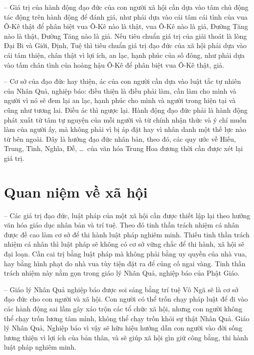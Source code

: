 -- Giá trị của hành động đạo đức của con người xã hội cần dựa vào tâm chủ động tác động trên hành động để đánh giá, như phải dựa vào cái tâm cái tình của vua Ô-Kê thật để phân biệt vua Ô-Kê nào là thật, vua Ô-Kê nào là giả, Đường Tăng nào là thật, Đường Tăng nào là giả. Nếu tiêu chuẩn giá trị của giải thoát là lòng Đại Bi và Giới, Định, Tuệ thì tiêu chuẩn giá trị đạo đức của xã hội phải dựa vào cái tâm thiện, chân thật vì lợi ích, an lạc, hạnh phúc của số đông, như phải dựa vào tấm chân tình của hoàng hậu Ô-Kê để phân biệt vua Ô-Kê thật, giả.

-- Cơ sở của đạo đức hay thiện, ác của con người cần dựa vào luật tắc tự nhiên của Nhân Quả, nghiệp báo: điều thiện là điều phải làm, cần làm cho mình và người vì nó sẽ đem lại an lạc, hạnh phúc cho mình và người trong hiện tại và cũng như tương lai. Điều ác thì ngược lại. Hành động đạo đức phải là hành động phát xuất từ tâm tự nguyện của mỗi người và từ chính nhận thức và ý chí muốn làm của người ấy, mà không phải vì bị áp đặt hay vì nhân danh một thế lực nào từ bên ngoài. Đây là hướng đạo đức nhân bản, theo đó, các quy ước về Hiếu, Trung, Tình, Nghĩa, Đễ, \ldots ~của văn hóa Trung Hoa đương thời cần được xét lại giá trị.

\section{Quan niệm về xã hội} %
\label{sec:36_37_xa_hoi}

-- Các giá trị đạo đức, luật pháp của một xã hội cần được thiết lập lại theo hướng văn hóa giáo dục nhân bản và trí tuệ. Theo đó tinh thần trách nhiệm cá nhân được đề cao làm cơ sở để thi hành luật pháp nghiêm minh. Thiếu tinh thần trách nhiệm cá nhân thì luật pháp sẽ không có cơ sở vững chắc để thi hành, xã hội sẽ đại loạn. Cần cai trị bằng luật pháp mà không phải bằng uy quyền của nhà vua, hay bằng hình phạt do nhà vua tùy tiện đặt ra để củng cố ngai vàng. Tinh thần trách nhiệm này nằm gọn trong giáo lý Nhân Quả, nghiệp báo của Phật Giáo.

-- Giáo lý Nhân Quả nghiệp báo được soi sáng bằng trí tuệ Vô Ngã sẽ là cơ sở đạo đức cho con người và xã hội. Con người có thể trốn chạy pháp luật để đi vào các hành động sai lầm gây xáo trộn các tổ chức xã hội, nhưng con người không thể chạy trốn lương tâm mình, không thể chạy trốn khỏi sự thật Nhân Quả. Giáo lý Nhân Quả, Nghiệp báo vì vậy sẽ hữu hiệu hướng dẫn con người vào đời sống lương thiện vì lợi ích của bản thân, và sẽ giúp xã hội gìn giữ công bằng, thi hành luật pháp nghiêm minh.

